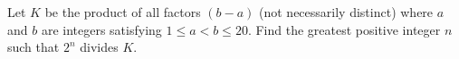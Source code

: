 Let $ K$ be the product of all factors $ (b-a)$ (not necessarily distinct) where $ a$ and $ b$ are integers satisfying $ 1\le a < b \le 20$. Find the greatest positive integer $ n$ such that $ 2^n$ divides $ K$.